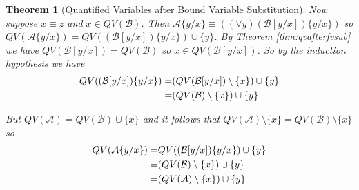 \documentclass[12pt]{article}
\theoremstyle{break}
\theoremstyle{break}
\newtheorem{theorem}{Theorem}[section]
\theoremstyle{break}
\theoremstyle{break}
\theoremstyle{break}
\newtheorem{informal definition}[definition]{Informal Definition}
\newcommand{\mc}[1]{\mathcal{#1}}
\begin{document}
\begin{theorem}[Quantified Variables after Bound Variable Substitution]
Now suppose $x\equiv z$ and $x\in QV(\mc{B})$.
Then $\mc{A}\{y/x\} \equiv ((\forall y) (\mc{B}[y/x])\{y/x\})$ so $QV(\mc{A}\{y/x\}) = QV((\mc{B}[y/x])\{y/x\}) \cup \{y\}$.
By Theorem \ref{thm:qvafterfvsub} we have $QV(\mc{B}[y/x]) = QV(\mc{B})$ so $x\in QV(\mc{B}[y/x])$.
So by the induction hypothesis we have
\begin{align}
QV((\mc{B}[y/x])\{y/x\}) =& (QV(\mc{B}[y/x])\setminus\{x\})\cup \{y\} \notag \\
=& (QV(\mc{B}) \setminus\{x\})\cup\{y\}
\end{align}

But $QV(\mc{A}) = QV(\mc{B})\cup\{x\}$  and it follows that $QV(\mc{A})\setminus\{x\} = QV(\mc{B})\setminus\{x\}$ so
\begin{align}
QV(\mc{A}\{y/x\}) =& QV((\mc{B}[y/x])\{y/x\})\cup \{y\} \notag \\
=& (QV(\mc{B}) \setminus\{x\}) \cup\{y\}\notag\\
=& (QV(\mc{A})\setminus\{x\}) \cup \{y\}\notag
\end{align}
\end{theorem}
\end{document}
